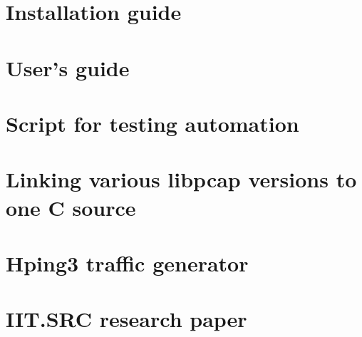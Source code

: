 \documentclass[12pt,a4paper,twoside]{book}
\begin{document}
\begin{appendices}
    \chapter{Installation guide} \label{appendix:install}
        
    \chapter{User's guide} \label{appendix:userguide}
        
    \chapter{Script for testing automation} \label{appendix:script:testing}
        
        
    \chapter{Linking various libpcap versions to one C source} \label{appendix:compilation:pcaps}
        
    \chapter{Hping3 traffic generator} \label{appendix:hping3}
        
    \chapter{IIT.SRC research paper} \label{appendix:iitsrc:paper}
        

\end{appendices}
\end{document}

